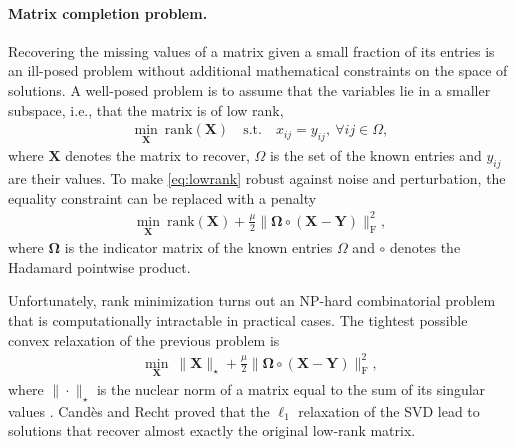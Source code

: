 \documentclass{article}
\begin{document}
\paragraph*{Matrix completion problem.}
Recovering the missing values of a matrix given a small fraction of its entries is an ill-posed problem without additional mathematical constraints on the space of solutions. A well-posed problem is to assume that the variables lie in a smaller subspace, i.e., that the matrix is of low rank, 
\begin{eqnarray}
\min_{\mathbf{X}} \ \textrm{rank}(\mathbf{X}) \quad \textrm{s.t.} \quad x_{ij}=y_{ij},\  \forall ij \in \Omega,
\label{eq:lowrank}
\end{eqnarray}
 where $\mathbf{X}$ denotes the matrix to recover, $\Omega$ is the set of the known entries and $y_{ij}$ are their values. To make   \eqref{eq:lowrank} robust against noise and perturbation, the equality constraint can be replaced with a penalty 
\begin{eqnarray}
 \min_{\mathbf{X}} \ \textrm{rank}(\mathbf{X}) + \frac{\mu}{2} \| \boldsymbol{\Omega} \circ (\mathbf{X}-\mathbf{Y}) \|_\mathrm{F}^2, 
  \end{eqnarray}
 where $\boldsymbol{\Omega}$ is the indicator matrix of the known entries $\Omega$ and $\circ$ denotes the Hadamard pointwise product. 


Unfortunately, rank minimization turns out an NP-hard  combinatorial problem  that is computationally intractable in practical cases. The tightest possible convex relaxation of the previous problem is  
  \begin{eqnarray}
 \min_{\mathbf{X}}  \ \| \mathbf{X} \|_\star + \frac{\mu}{2} \|\boldsymbol{\Omega} \circ (\mathbf{X}-\mathbf{Y}) \|_\mathrm{F}^2,
  \end{eqnarray}
where $\| \cdot \|_\star$ is the nuclear norm of a matrix equal to the sum of its singular values \cite{art:CandesRecht09MatrixComple}. 
Cand{\`e}s and Recht \citeyear{art:CandesRecht09MatrixComple} proved that the $\ell_1$ relaxation of the SVD lead to solutions that recover almost exactly the original low-rank matrix. 
\end{document}
